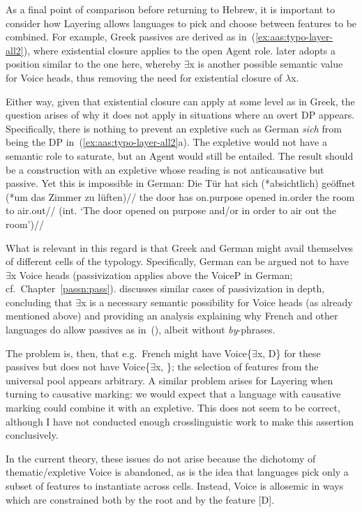 As a final point of comparison before returning to Hebrew, it is important to consider how Layering allows languages to pick and choose between features to be combined. For example, Greek passives are derived as in~(\ref{ex:aas:typo-layer-all2}), where existential closure applies to the open Agent role. \cite{schaefer17oup} later adopts a position similar to the one here, whereby $\exists$x is another possible semantic value for Voice heads, thus removing the need for existential closure of $\lambda$x.

Either way, given that existential closure can apply at some level as in Greek, the question arises of why it does not apply in situations where an overt DP appears. Specifically, there is nothing to prevent an expletive such as German \emph{sich} from being the DP in~(\ref{ex:aas:typo-layer-all2}a). The expletive would not have a semantic role to saturate, but an Agent would still be entailed. The result should be a construction with an expletive whose reading is not anticausative but passive. Yet this is impossible in German:
\ex \begingl
	\gla Die T\"ur hat sich (*absichtlich) ge\"offnet (*um das Zimmer zu l\"uften)//
	\glb the door has  on.purpose opened in.order the room to air.out//
	\glft (int. `The door opened on purpose and/or in order to air out the room')//
	\endgl
\xe

What is relevant in this regard is that Greek and German might avail themselves of different cells of the typology. Specifically, German can be argued not to have $\exists$x Voice heads (passivization applies above the VoiceP in German; cf.~Chapter~\ref{passn:pass}). \cite{schaefer17oup} discusses similar cases of passivization in depth, concluding that $\exists$x is a necessary semantic possibility for Voice heads (as already mentioned above) and providing an analysis explaining why French and other languages do allow passives as in~(\lastx), albeit without \emph{by}-phrases.

The problem is, then, that e.g.~French might have Voice\{$\exists$x, D\} for these passives but does not have Voice\{$\exists$x, \zero\}; the selection of features from the universal pool appears arbitrary. A similar problem arises for Layering when turning to causative marking: we would expect that a language with causative marking could combine it with an expletive. This does not seem to be correct, although I have not conducted enough crosslinguistic work to make this assertion conclusively.

In the current theory, these issues do not arise because the dichotomy of thematic/expletive Voice is abandoned, as is the idea that languages pick only a subset of features to instantiate across cells. Instead, Voice is allosemic in ways which are constrained both by the root and by the feature [D].


